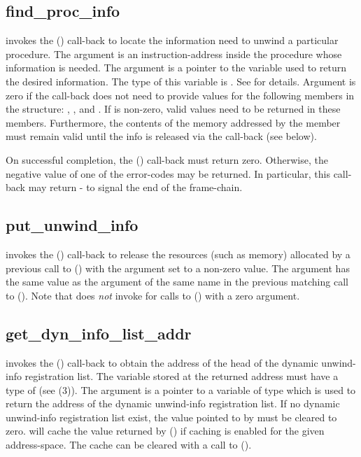 \documentclass{article}
\begin{document}
\subsection{find\_proc\_info}

 invokes the () call-back to
locate the information need to unwind a particular procedure.  The
 argument is an instruction-address inside the procedure whose
information is needed.  The  argument is a pointer to the
variable used to return the desired information.  The type of this
variable is .  See
 for details.  Argument
 is zero if the call-back does not need to
provide values for the following members in the
 structure: ,
, and .  If
 is non-zero, valid values need to be returned
in these members.  Furthermore, the contents of the memory addressed
by the  member must remain valid until the info is
released via the  call-back (see below).

On successful completion, the () call-back must
return zero.  Otherwise, the negative value of one of the
 error-codes may be returned.  In particular, this
call-back may return - to signal the end of
the frame-chain.

\subsection{put\_unwind\_info}

 invokes the () call-back to
release the resources (such as memory) allocated by a previous call to
() with the  argument
set to a non-zero value.  The  argument has the same value as
the argument of the same name in the previous matching call to
().  Note that  does \emph{not}
invoke  for calls to ()
with a zero  argument.


\subsection{get\_dyn\_info\_list\_addr}

 invokes the ()
call-back to obtain the address of the head of the dynamic unwind-info
registration list.  The variable stored at the returned address must
have a type of  (see
(3)).  The  argument is a pointer
to a variable of type  which is used to return the
address of the dynamic unwind-info registration list.  If no dynamic
unwind-info registration list exist, the value pointed to by
 must be cleared to zero.   will cache the
value returned by () if caching is
enabled for the given address-space.  The cache can be cleared with a
call to ().
\end{document}
